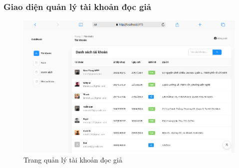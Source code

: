\subsubsection{Giao diện quản lý tài khoản đọc giả}
\begin{figure}[H]
  \centering
  \includegraphics[width=1\textwidth]{report/images/admin/taikhoan.png}
  \caption{Trang quản lý tài khoản đọc giả}
\end{figure}